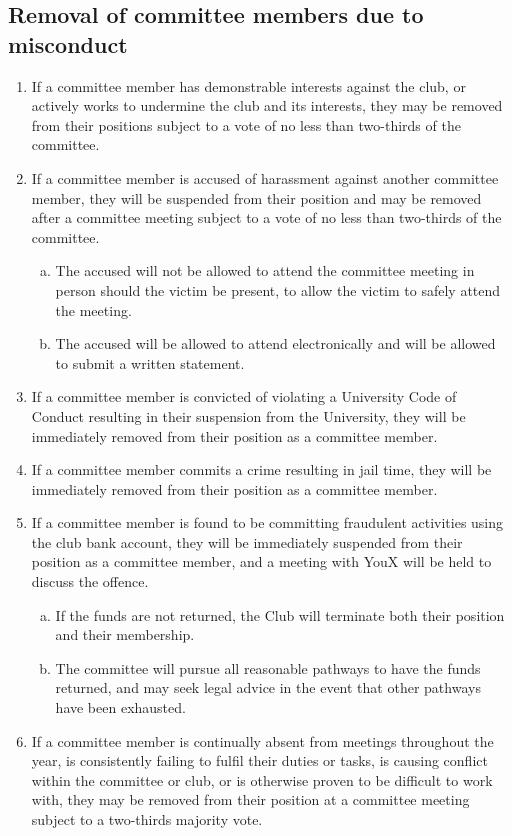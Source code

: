 \documentclass{constitution}
\begin{document}
\subsection{Removal of committee members due to misconduct}
\begin{enumerate}[(1)]
    \item If a committee member has demonstrable interests against the club, or actively works to undermine the club and its interests, they may be removed from their positions subject to a vote of no less than two-thirds of the committee.
    \item If a committee member is accused of harassment against another committee member, they will be suspended from their position and may be removed after a committee meeting subject to a vote of no less than two-thirds of the committee.
          \begin{enumerate}[(a)]
              \item The accused will not be allowed to attend the committee meeting in person should the victim be present, to allow the victim to safely attend the meeting.
              \item The accused will be allowed to attend electronically and will be allowed to submit a written statement.
          \end{enumerate}
    \item If a committee member is convicted of violating a University Code of Conduct resulting in their suspension from the University, they will be immediately removed from their position as a committee member.
    \item If a committee member commits a crime resulting in jail time, they will be immediately removed from their position as a committee member.
    \item If a committee member is found to be committing fraudulent activities using the club bank account, they will be immediately suspended from their position as a committee member, and a meeting with YouX will be held to discuss the offence.
          \begin{enumerate}[(a)]
              \item If the funds are not returned, the Club will terminate both their position and their membership.
              \item The committee will pursue all reasonable pathways to have the funds returned, and may seek legal advice in the event that other pathways have been exhausted.
          \end{enumerate}
    \item If a committee member is continually absent from meetings throughout the year, is consistently failing to fulfil their duties or tasks, is causing conflict within the committee or club, or is otherwise proven to be difficult to work with, they may be removed from their position at a committee meeting subject to a two-thirds majority vote.
\end{enumerate}
\end{document}
